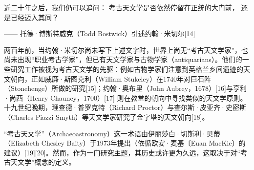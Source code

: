 近二十年之后，我们仍可以追问：  
考古天文学是否依然停留在正统的大门前，  
还是已经迈入其间？  

—— 托德·博斯特威克（Todd Bostwick）引述约翰·米切尔[14]

两百年前，当约翰·米切尔尚未写下上述文字时，世界上尚无“考古天文学家”，也尚未出现“职业考古学家”，但已有天文学家与古物学家（antiquarians）。他们的一些研究工作被视为考古天文学的先驱：例如古物学家们注意到英格兰乡间遗迹的天文朝向，正如威廉·斯图克利（William Stukeley）在1740年对巨石阵（Stonehenge）所做的研究[15]；约翰·奥布里（John Aubrey，1678）[16]与亨利·尚西（Henry Chauncy，1700）[17] 则在教堂的朝向中寻找类似的天文学原则。十九世纪晚期，理查德·普罗克特（Richard Proctor）与查尔斯·皮亚齐·史密斯（Charles Piazzi Smyth）等天文学家研究了金字塔的天文朝向[18]。

“考古天文学”（Archaeoastronomy）这一术语由伊丽莎白·切斯利·贝蒂（Elizabeth Chesley Baity）于1973年提出（依循欧安·麦基〔Euan MacKie〕的建议）[19][20]。然而，作为一门研究主题，其历史或许更为久远，这取决于对“考古天文学”概念的定义。  

